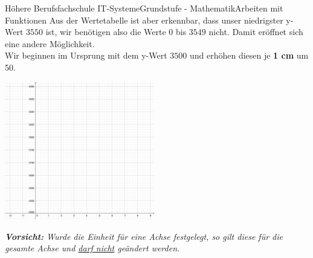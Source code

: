 \documentclass[11pt,twocolumn,oneside,openany,headings=optiontotoc,11pt,numbers=noenddot]{article}
\begin{document}
\begin{worksheet}{Höhere Berufsfachschule IT-Systeme}{Grundstufe - Mathematik}{Arbeiten mit Funktionen}
		Aus der Wertetabelle ist aber erkennbar, dass unser niedrigster y-Wert \(3550\) ist, wir benötigen also die Werte 0 bis \(3549\) nicht. Damit eröffnet sich eine andere Möglichkeit.\\
		Wir beginnen im Ursprung mit dem y-Wert \(3500\) und erhöhen diesen je \textbf{1 cm} um 50.\\
		\par\bigskip\noindent
		\includegraphics[width=0.49\textwidth]{../99_Bilder/b2Koord1.jpg}\\
		\par\bigskip\noindent
		\textit{\textbf{Vorsicht:} Wurde die Einheit für eine Achse festgelegt, so gilt diese für die gesamte Achse und \underline{darf nicht} geändert werden.}
	\end{worksheet}
\end{document}
